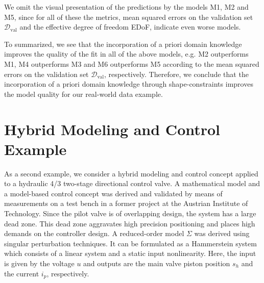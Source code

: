 We omit the visual presentation of the predictions by the models M1, M2 and M5, since for all of these the metrics, mean squared errors on the validation set $\mathcal{D}_{\text{val}}$ and the effective degree of freedom EDoF, indicate even worse models.

To summarized, we see that the incorporation of a priori domain knowledge improves the quality of the fit in all of the above models, e.g. M2 outperforms M1, M4 outperforms M3 and M6 outperforms M5 according to the mean squared errors on the validation set $\mathcal{D}_{\text{val}}$, respectively. Therefore, we conclude that the incorporation of a priori domain knowledge through shape-constraints improves the model quality for our real-world data example. 

\section{Hybrid Modeling and Control Example} \label{sec:real-world-application2}

As a second example, we consider a hybrid modeling and control concept applied to a hydraulic 4/3 two-stage directional control valve. A mathematical model and a model-based control concept was derived and validated by means of measurements on a test bench in a former project at the Austrian Institute of Technology. Since the pilot valve is of overlapping design, the system has a large dead zone. This dead zone aggravates high precision positioning and places high demands on the controller design. A reduced-order model $\Sigma$ was derived using singular perturbation techniques. It can be formulated as a Hammerstein system which consists of a linear system and a static input nonlinearity. Here, the input is given by the voltage $u$ and outputs are the main valve piston position $s_h$ and the current $i_p$, respectively. 


